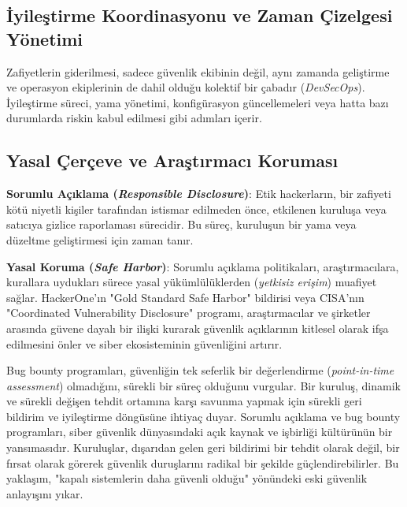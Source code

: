 \subsection{İyileştirme Koordinasyonu ve Zaman Çizelgesi Yönetimi}

Zafiyetlerin giderilmesi, sadece güvenlik ekibinin değil, aynı zamanda geliştirme ve operasyon ekiplerinin de dahil olduğu kolektif bir çabadır (\textit{DevSecOps}). İyileştirme süreci, yama yönetimi, konfigürasyon güncellemeleri veya hatta bazı durumlarda riskin kabul edilmesi gibi adımları içerir.

\subsection{Yasal Çerçeve ve Araştırmacı Koruması}

\textbf{Sorumlu Açıklama (\textit{Responsible Disclosure})}: Etik hackerların, bir zafiyeti kötü niyetli kişiler tarafından istismar edilmeden önce, etkilenen kuruluşa veya satıcıya gizlice raporlaması sürecidir. Bu süreç, kuruluşun bir yama veya düzeltme geliştirmesi için zaman tanır.

\textbf{Yasal Koruma (\textit{Safe Harbor})}: Sorumlu açıklama politikaları, araştırmacılara, kurallara uydukları sürece yasal yükümlülüklerden (\textit{yetkisiz erişim}) muafiyet sağlar. HackerOne'ın "Gold Standard Safe Harbor" bildirisi veya CISA'nın "Coordinated Vulnerability Disclosure" programı, araştırmacılar ve şirketler arasında güvene dayalı bir ilişki kurarak güvenlik açıklarının kitlesel olarak ifşa edilmesini önler ve siber ekosisteminin güvenliğini artırır.

Bug bounty programları, güvenliğin tek seferlik bir değerlendirme (\textit{point-in-time assessment}) olmadığını, sürekli bir süreç olduğunu vurgular. Bir kuruluş, dinamik ve sürekli değişen tehdit ortamına karşı savunma yapmak için sürekli geri bildirim ve iyileştirme döngüsüne ihtiyaç duyar. Sorumlu açıklama ve bug bounty programları, siber güvenlik dünyasındaki açık kaynak ve işbirliği kültürünün bir yansımasıdır. Kuruluşlar, dışarıdan gelen geri bildirimi bir tehdit olarak değil, bir fırsat olarak görerek güvenlik duruşlarını radikal bir şekilde güçlendirebilirler. Bu yaklaşım, "kapalı sistemlerin daha güvenli olduğu" yönündeki eski güvenlik anlayışını yıkar.
